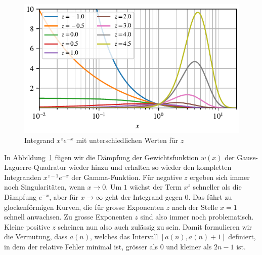 \begin{figure}
\centering
% 
\includegraphics{papers/laguerre/images/integrand_exp.pdf}
\caption{Integrand $x^z e^{-x}$ mit unterschiedlichen Werten für $z$}
\label{laguerre:fig:integrand_exp}
\end{figure}

In Abbildung~\ref{laguerre:fig:integrand_exp} fügen wir
die Dämpfung der Gewichtsfunktion $w(x)$
der Gauss-Laguerre-Quadratur wieder hinzu
und erhalten so wieder den kompletten Integranden $x^{z-1} e^{-x}$
der Gamma-Funktion.
Für negative $z$ ergeben sich immer noch Singularitäten,
wenn $x \rightarrow 0$.
Um $1$ wächst der Term $x^z$ schneller als die Dämpfung $e^{-x}$,
aber für $x \rightarrow \infty$ geht der Integrand gegen $0$.
Das führt zu glockenförmigen Kurven,
die für grosse Exponenten $z$ nach der Stelle $x=1$ schnell anwachsen.
Zu grosse Exponenten $z$ sind also immer noch problematisch.
Kleine positive $z$ scheinen nun also auch zulässig zu sein.
Damit formulieren wir die Vermutung,
dass $a(n)$,
welches das Intervall $[a(n), a(n) + 1]$ definiert,
in dem der relative Fehler minimal ist,
grösser als $0$ und kleiner als $2n-1$ ist.

